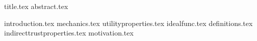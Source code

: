 \documentclass[11pt]{llncs}
\begin{document}
{title.tex}
\thispagestyle{plain}
{abstract.tex}

{introduction.tex}
{mechanics.tex}
{utilityproperties.tex}
{idealfunc.tex}
{definitions.tex}
{indirecttrustproperties.tex}
{motivation.tex}

\end{document}
